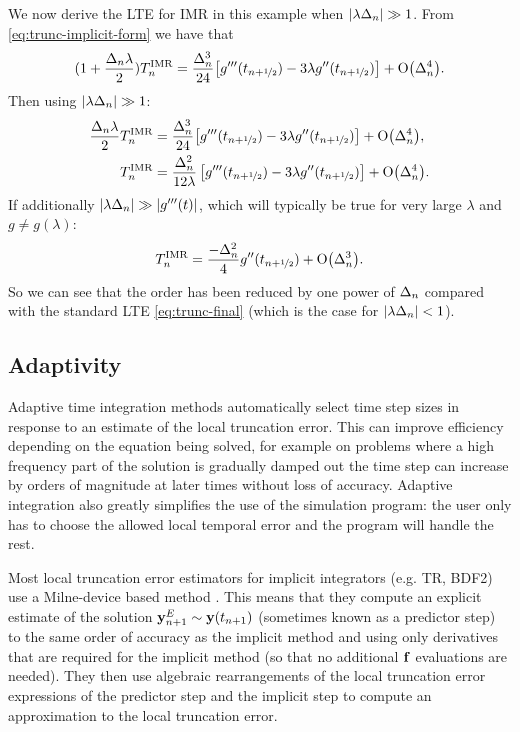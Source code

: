 We now derive the LTE for IMR in this example when $\left|{\lambda\Delta_{n}} \right| \gg 1$.
From \cref{eq:trunc-implicit-form} we have that
\begin{equation}
  \begin{aligned}
    (1 + \frac{\Delta_{n} \lambda}{2})T_n^{\text{IMR}} &= \frac{\Delta_{n}^3}{24}
    {\left[ g'''(t_{n+\nicefrac{1}{2}}) - 3 \lambda g''(t_{n+\nicefrac{1}{2}}) \right]} + \text{O}{\left( \Delta_{n}^4 \right)}. \\ 
  \end{aligned}
\end{equation}
Then using $\left|{\lambda\Delta_{n}} \right| \gg 1$:
\begin{equation}
  \begin{aligned}
    \frac{\Delta_{n} \lambda}{2} T_n^{\text{IMR}} &= \frac{\Delta_{n}^3}{24}
    {\left[ g'''(t_{n+\nicefrac{1}{2}}) - 3 \lambda g''(t_{n+\nicefrac{1}{2}}) \right]} + \text{O}{\left( \Delta_{n}^4 \right)}, \\ 
    T_n^{\text{IMR}} &= \frac{\Delta_{n}^2}{12\lambda} \left[g'''(t_{n+\nicefrac{1}{2}}) - 3 \lambda g''(t_{n+\nicefrac{1}{2}}) \right] + \text{O}{\left( \Delta_{n}^4 \right)}. \\
  \end{aligned}
\end{equation}
If additionally $\left|{\lambda\Delta_{n}} \right| \gg \left|{g'''(t)} \right|$, which will typically be true for very large $\lambda$ and $g \neq g(\lambda)$:
\begin{equation}
  T_n^{\text{IMR}} = \frac{-\Delta_{n}^2}{4} g''(t_{n+\nicefrac{1}{2}}) + \text{O}{\left( \Delta_{n}^3 \right)}.
  \label{eq:reduced-order-imr-truncation-error}
\end{equation}
So we can see that the order has been reduced by one power of $\Delta_{n}$ compared with the standard LTE \cref{eq:trunc-final} (which is the case for $\left|{\lambda\Delta_{n}} \right| < 1$).


\subsection{Adaptivity}
\label{sec:adaptivity}

Adaptive time integration methods automatically select time step sizes in response to an estimate of the local truncation error.
This can improve efficiency depending on the equation being solved, for example on problems where a high frequency part of the solution is gradually damped out the time step can increase by orders of magnitude at later times without loss of accuracy.
Adaptive integration also greatly simplifies the use of the simulation program: the user only has to choose the allowed local temporal error and the program will handle the rest.

Most local truncation error estimators for implicit integrators (e.g. TR, BDF2) use a Milne-device based method \cite[707-716]{GreshoSani}.
This means that they compute an explicit estimate of the solution $\mathbf{y}^E_{n+1} \sim \mathbf{y}(t_{n+1})$  (sometimes known as a predictor step) to the same order of accuracy as the implicit method and using only derivatives that are required for the implicit method (so that no additional ${\mathbf{f}}$ evaluations are needed).
They then use algebraic rearrangements of the local truncation error expressions of the predictor step and the implicit step to compute an approximation to the local truncation error.

